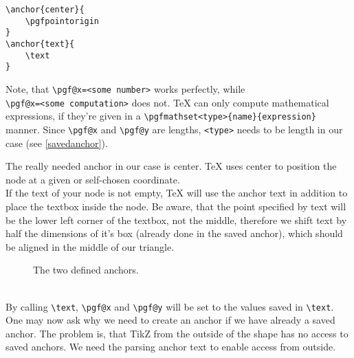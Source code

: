 \documentclass[12pt]{article}
\begin{document}
\begin{lstlisting}[caption=Creation of the one (two) necessary anchor(s),label=necessesaryanchors]
\anchor{center}{
	\pgfpointorigin
}
\anchor{text}{
	\text
}
\end{lstlisting}
Note, that \lstinline$\pgf@x=<some number>$ works perfectly, while\\\lstinline$\pgf@x=<some computation>$ does not. TeX can only compute mathematical expressions, if they're given in a \lstinline!\pgfmathset<type>{name}{expression}! manner. Since \lstinline!\pgf@x! and \lstinline!\pgf@y! are lengths, \lstinline!<type>! needs to be length in our case (see \autoref{savedanchor}).\\
\def\k{0.45}
\begin{minipage}[l]{\k\textwidth}
The really needed anchor in our case is center. TeX uses center to position the node at a given or self-chosen coordinate.\\
If the text of your node is not empty, TeX will use the anchor text in addition to place the textbox inside the node. Be aware, that the point specified by text will be the lower left corner of the textbox, not the middle, therefore we shift text by half the dimensions of it's box (already done in the saved anchor), which should be aligned in the middle of our triangle.
\end{minipage}
\begin{minipage}[r]{\k\textwidth}
\begin{figure}[H]
\begin{center}
\end{center}\caption{The two defined anchors.}
\end{figure}
\end{minipage}\\
By calling \lstinline!\text!, \lstinline!\pgf@x! and \lstinline!\pgf@y! will be set to the values saved in \lstinline!\text!. One may now ask why we need to create an anchor if we have already a saved anchor. The problem is, that TikZ from the outside of the shape has no access to saved anchors. We need the parsing anchor text to enable access from outside.\\
\end{document}
